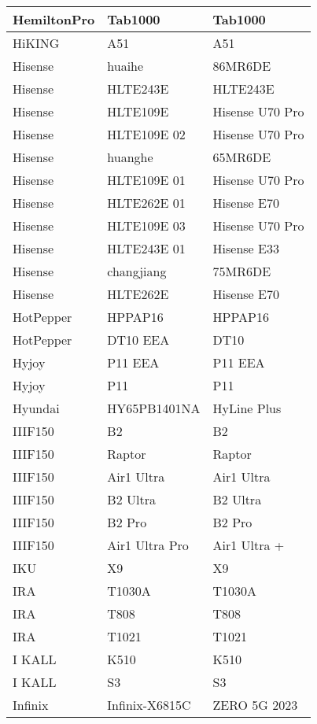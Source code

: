 \begin{tabularx}{\linewidth}{|l|X|X|}
        HemiltonPro & Tab1000 & Tab1000 \\ \hline
        HiKING & A51 & A51 \\ \hline
        Hisense & huaihe & 86MR6DE \\ \hline
        Hisense & HLTE243E & HLTE243E \\ \hline
        Hisense & HLTE109E & Hisense U70 Pro \\ \hline
        Hisense & HLTE109E 02 & Hisense U70 Pro \\ \hline
        Hisense & huanghe & 65MR6DE \\ \hline
        Hisense & HLTE109E 01 & Hisense U70 Pro \\ \hline
        Hisense & HLTE262E 01 & Hisense E70 \\ \hline
        Hisense & HLTE109E 03 & Hisense U70 Pro \\ \hline
        Hisense & HLTE243E 01 & Hisense E33 \\ \hline
        Hisense & changjiang & 75MR6DE \\ \hline
        Hisense & HLTE262E & Hisense E70 \\ \hline
        HotPepper & HPPAP16 & HPPAP16 \\ \hline
        HotPepper & DT10 EEA & DT10 \\ \hline
        Hyjoy & P11 EEA & P11 EEA \\ \hline
        Hyjoy & P11 & P11 \\ \hline
        Hyundai & HY65PB1401NA & HyLine Plus \\ \hline
        IIIF150 & B2 & B2 \\ \hline
        IIIF150 & Raptor & Raptor \\ \hline
        IIIF150 & Air1 Ultra & Air1 Ultra \\ \hline
        IIIF150 & B2 Ultra & B2 Ultra \\ \hline
        IIIF150 & B2 Pro & B2 Pro \\ \hline
        IIIF150 & Air1 Ultra Pro & Air1 Ultra + \\ \hline
        IKU & X9 & X9 \\ \hline
        IRA & T1030A & T1030A \\ \hline
        IRA & T808 & T808 \\ \hline
        IRA & T1021 & T1021 \\ \hline
        I KALL & K510 & K510 \\ \hline
        I KALL & S3 & S3 \\ \hline
        Infinix & Infinix-X6815C & ZERO 5G 2023 \\ \hline

\end{tabularx}
